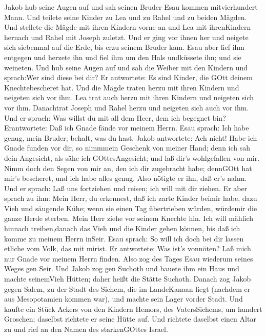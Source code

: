  Jakob hub seine Augen auf und sah seinen Bruder Esau kommen
mitvierhundert Mann. Und teilete seine Kinder zu Lea und zu Rahel und zu
beiden Mägden.  Und stellete die Mägde mit ihren Kindern
vorne an und Lea mit ihrenKindern hernach und Rahel mit Joseph zuletzt.
 Und er ging vor ihnen her und neigete sich siebenmal auf
die Erde, bis erzu seinem Bruder kam.  Esau aber lief ihm
entgegen und herzete ihn und fiel ihm um den Hals undküssete ihn; und
sie weineten.  Und hub seine Augen auf und sah die Weiber
mit den Kindern und sprach:Wer sind diese bei dir? Er antwortete: Es
sind Kinder, die GOtt deinem Knechtebescheret hat.  Und die
Mägde traten herzu mit ihren Kindern und neigeten sich vor ihm.
 Lea trat auch herzu mit ihren Kindern und neigeten sich vor
ihm. Danachtrat Joseph und Rahel herzu und neigeten sich auch vor ihm.
 Und er sprach: Was willst du mit all dem Heer, dem ich
begegnet bin? Erantwortete: Daß ich Gnade fände vor meinem Herrn.
 Esau sprach: Ich habe genug, mein Bruder; behalt, was du
hast.  Jakob antwortete: Ach nicht! Habe ich Gnade funden
vor dir, so nimmmein Geschenk von meiner Hand; denn ich sah dein
Angesicht, als sähe ich GOttesAngesicht; und laß dir's wohlgefallen von
mir.  Nimm doch den Segen von mir an, den ich dir
zugebracht habe; dennGOtt hat mir's bescheret, und ich habe alles genug.
Also nötigte er ihn, daß er's nahm.  Und er sprach: Laß uns
fortziehen und reisen; ich will mit dir ziehen.  Er aber
sprach zu ihm: Mein Herr, du erkennest, daß ich zarte Kinder beimir
habe, dazu Vieh und säugende Kühe; wenn sie einen Tag übertrieben
würden, würdemir die ganze Herde sterben.  Mein Herr ziehe
vor seinem Knechte hin. Ich will mählich hinnach treiben,danach das Vieh
und die Kinder gehen können, bis daß ich komme zu meinem Herrn inSeir.
 Esau sprach: So will ich doch bei dir lassen etliche vom
Volk, das mit mirist. Er antwortete: Was ist's vonnöten? Laß mich nur
Gnade vor meinem Herrn finden.  Also zog des Tages Esau
wiederum seines Weges gen Seir.  Und Jakob zog gen Suchoth
und bauete ihm ein Haus und machte seinemVieh Hütten; daher heißt die
Stätte Suchoth.  Danach zog Jakob gegen Salem, zu der Stadt
des Sichem, die im LandeKanaan liegt (nachdem er aus Mesopotamien kommen
war), und machte sein Lager vorder Stadt.  Und kaufte ein
Stück Ackers von den Kindern Hemors, des VatersSichems, um hundert
Groschen; daselbst richtete er seine Hütte auf.  Und
richtete daselbst einen Altar zu und rief an den Namen des starkenGOttes
Israel.


